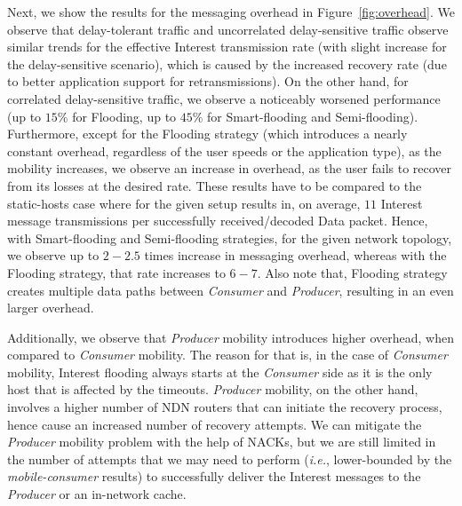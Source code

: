 \documentclass[conference]{IEEEtran}
\begin{document}
Next, we show the results for the messaging overhead in Figure~\ref{fig:overhead}. We observe that delay-tolerant traffic and uncorrelated delay-sensitive traffic observe similar trends for the effective Interest transmission rate (with slight increase for the delay-sensitive scenario), which is caused by the increased recovery rate (due to better application support for retransmissions). On the other hand, for correlated delay-sensitive traffic, we observe a noticeably worsened performance (up to $15\%$ for Flooding, up to $45\%$ for Smart-flooding and Semi-flooding). Furthermore, except for the Flooding strategy (which introduces a nearly constant overhead, regardless of the user speeds or the application type), as the mobility increases, we observe an increase in overhead, as the user fails to recover from its losses at the desired rate. These results have to be compared to the static-hosts case where for the given setup results in, on average, $11$ Interest message transmissions per successfully received/decoded Data packet. Hence, with Smart-flooding and Semi-flooding strategies, for the given network topology, we observe up to $2-2.5$ times increase in messaging overhead, whereas with the Flooding strategy, that rate increases to $6-7$. Also note that, Flooding strategy creates multiple data paths between \emph{Consumer} and \emph{Producer}, resulting in an even larger overhead.


Additionally, we observe that \emph{Producer} mobility introduces higher overhead, when compared to \emph{Consumer} mobility. The reason for that is, in the case of \emph{Consumer} mobility, Interest flooding always starts at the \emph{Consumer} side as it is the only host that is affected by the timeouts. \emph{Producer} mobility, on the other hand, involves a higher number of NDN routers that can initiate the recovery process, hence cause an increased number of recovery attempts. We can mitigate the \emph{Producer} mobility problem with the help of NACKs, but we are still limited in the number of attempts that we may need to perform (\emph{i.e.}, lower-bounded by the \emph{mobile-consumer} results) to successfully deliver the Interest messages to the \emph{Producer} or an in-network cache.
\end{document}
